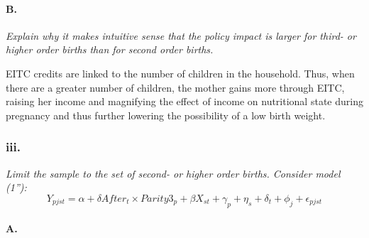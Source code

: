 \documentclass[
]{article}
\newenvironment{Shaded}{\begin{snugshade}}{\end{snugshade}}
\newcommand{\CommentTok}[1]{\textcolor[rgb]{0.56,0.35,0.01}{\textit{#1}}}
\newcommand{\DataTypeTok}[1]{\textcolor[rgb]{0.13,0.29,0.53}{#1}}
\newcommand{\KeywordTok}[1]{\textcolor[rgb]{0.13,0.29,0.53}{\textbf{#1}}}
\newcommand{\NormalTok}[1]{#1}
\newcommand{\OperatorTok}[1]{\textcolor[rgb]{0.81,0.36,0.00}{\textbf{#1}}}
\newcommand{\StringTok}[1]{\textcolor[rgb]{0.31,0.60,0.02}{#1}}
\begin{document}
\begin{Shaded}
\end{Shaded}

\hypertarget{b.-5}{%
\paragraph{B.}\label{b.-5}}

\emph{Explain why it makes intuitive sense that the policy impact is
larger for third- or higher order births than for second order births.}

EITC credits are linked to the number of children in the household.
Thus, when there are a greater number of children, the mother gains more
through EITC, raising her income and magnifying the effect of income on
nutritional state during pregnancy and thus further lowering the
possibility of a low birth weight.

\hypertarget{iii.}{%
\subsubsection{iii.}\label{iii.}}

\emph{Limit the sample to the set of second- or higher order births.
Consider model (1''):}
\[Y_{pjst} = \alpha + \delta After_{t} \times Parity3_{p}  +\beta X_{st} + \gamma_p + \eta_s + \delta_t + \phi_j + \epsilon_{pjst}\]

\hypertarget{a.-6}{%
\paragraph{A.}\label{a.-6}}
\end{document}
